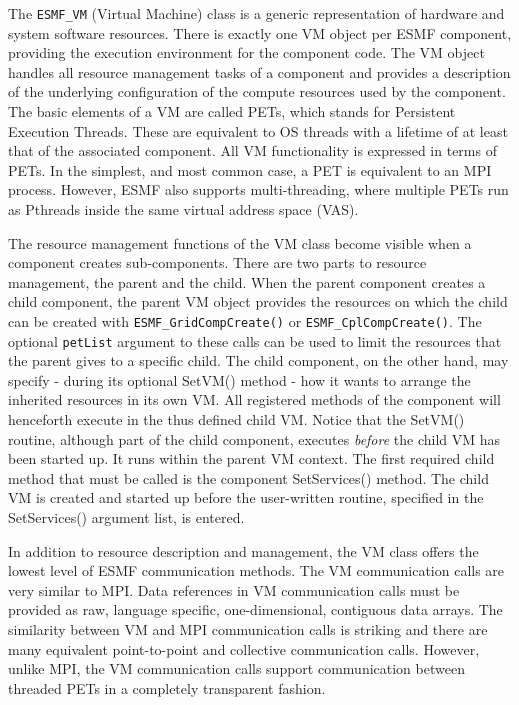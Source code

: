 
The {\tt ESMF\_VM} (Virtual Machine) class is a generic representation of hardware and system software resources. There is exactly one VM object per ESMF component, providing the execution environment for the component code. The VM object handles all resource management tasks of a component and provides a description of the underlying configuration of the compute resources used by the component. The basic elements of a VM are called PETs, which stands for Persistent Execution Threads.  These are equivalent to OS threads with a lifetime of at least that of the associated component. All VM functionality is expressed in terms of PETs. In the simplest, and most common case, a PET is equivalent to an MPI process. However, ESMF also supports multi-threading, where multiple PETs run as Pthreads inside the same virtual address space (VAS).

The resource management functions of the VM class become visible when a component creates sub-components. There are two parts to resource management, the parent and the child. When the parent component creates a child component, the parent VM object provides the resources on which the child can be created with {\tt ESMF\_GridCompCreate()} or {\tt ESMF\_CplCompCreate()}. The optional {\tt petList} argument to these calls can be used to limit the resources that the parent gives to a specific child. The child component, on the other hand, may specify - during its optional SetVM() method - how it wants to arrange the inherited resources in its own VM. All registered methods of the component will henceforth execute in the thus defined child VM. Notice that the SetVM() routine, although part of the child component, executes {\em before} the child VM has been started up. It runs within the parent VM context. The first required child method that must be called is the component SetServices() method. The child VM is created and started up before the user-written routine, specified in the SetServices() argument list, is entered.

In addition to resource description and management, the VM class offers the lowest level of ESMF communication methods. The VM communication calls are very similar to MPI. Data references in VM communication calls must be provided as raw, language specific, one-dimensional, contiguous data arrays. The similarity between VM and MPI communication calls is striking and there are many equivalent point-to-point and collective communication calls. However, unlike MPI, the VM communication calls support communication between threaded PETs in a completely transparent fashion.
